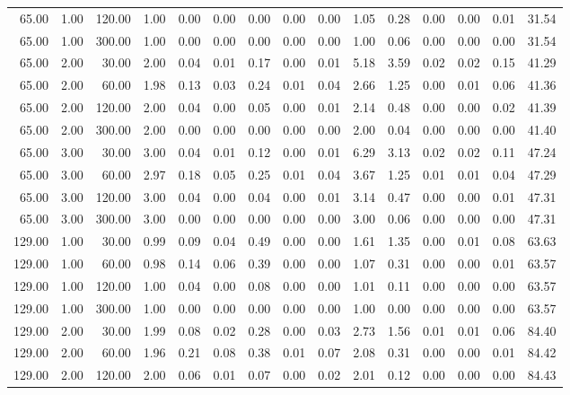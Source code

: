 \begin{table}[ht]
\begin{tabular}{rrrrrrrrrrrrrrr}
  65.00 & 1.00 & 120.00 & 1.00 & 0.00 & 0.00 & 0.00 & 0.00 & 0.00 & 1.05 & 0.28 & 0.00 & 0.00 & 0.01 & 31.54 \\ 
  65.00 & 1.00 & 300.00 & 1.00 & 0.00 & 0.00 & 0.00 & 0.00 & 0.00 & 1.00 & 0.06 & 0.00 & 0.00 & 0.00 & 31.54 \\ 
  65.00 & 2.00 & 30.00 & 2.00 & 0.04 & 0.01 & 0.17 & 0.00 & 0.01 & 5.18 & 3.59 & 0.02 & 0.02 & 0.15 & 41.29 \\ 
  65.00 & 2.00 & 60.00 & 1.98 & 0.13 & 0.03 & 0.24 & 0.01 & 0.04 & 2.66 & 1.25 & 0.00 & 0.01 & 0.06 & 41.36 \\ 
  65.00 & 2.00 & 120.00 & 2.00 & 0.04 & 0.00 & 0.05 & 0.00 & 0.01 & 2.14 & 0.48 & 0.00 & 0.00 & 0.02 & 41.39 \\ 
  65.00 & 2.00 & 300.00 & 2.00 & 0.00 & 0.00 & 0.00 & 0.00 & 0.00 & 2.00 & 0.04 & 0.00 & 0.00 & 0.00 & 41.40 \\ 
  65.00 & 3.00 & 30.00 & 3.00 & 0.04 & 0.01 & 0.12 & 0.00 & 0.01 & 6.29 & 3.13 & 0.02 & 0.02 & 0.11 & 47.24 \\ 
  65.00 & 3.00 & 60.00 & 2.97 & 0.18 & 0.05 & 0.25 & 0.01 & 0.04 & 3.67 & 1.25 & 0.01 & 0.01 & 0.04 & 47.29 \\ 
  65.00 & 3.00 & 120.00 & 3.00 & 0.04 & 0.00 & 0.04 & 0.00 & 0.01 & 3.14 & 0.47 & 0.00 & 0.00 & 0.01 & 47.31 \\ 
  65.00 & 3.00 & 300.00 & 3.00 & 0.00 & 0.00 & 0.00 & 0.00 & 0.00 & 3.00 & 0.06 & 0.00 & 0.00 & 0.00 & 47.31 \\ 
  129.00 & 1.00 & 30.00 & 0.99 & 0.09 & 0.04 & 0.49 & 0.00 & 0.00 & 1.61 & 1.35 & 0.00 & 0.01 & 0.08 & 63.63 \\ 
  129.00 & 1.00 & 60.00 & 0.98 & 0.14 & 0.06 & 0.39 & 0.00 & 0.00 & 1.07 & 0.31 & 0.00 & 0.00 & 0.01 & 63.57 \\ 
  129.00 & 1.00 & 120.00 & 1.00 & 0.04 & 0.00 & 0.08 & 0.00 & 0.00 & 1.01 & 0.11 & 0.00 & 0.00 & 0.00 & 63.57 \\ 
  129.00 & 1.00 & 300.00 & 1.00 & 0.00 & 0.00 & 0.00 & 0.00 & 0.00 & 1.00 & 0.00 & 0.00 & 0.00 & 0.00 & 63.57 \\ 
  129.00 & 2.00 & 30.00 & 1.99 & 0.08 & 0.02 & 0.28 & 0.00 & 0.03 & 2.73 & 1.56 & 0.01 & 0.01 & 0.06 & 84.40 \\ 
  129.00 & 2.00 & 60.00 & 1.96 & 0.21 & 0.08 & 0.38 & 0.01 & 0.07 & 2.08 & 0.31 & 0.00 & 0.00 & 0.01 & 84.42 \\ 
  129.00 & 2.00 & 120.00 & 2.00 & 0.06 & 0.01 & 0.07 & 0.00 & 0.02 & 2.01 & 0.12 & 0.00 & 0.00 & 0.00 & 84.43 \\ 

\end{tabular}
\end{table}
